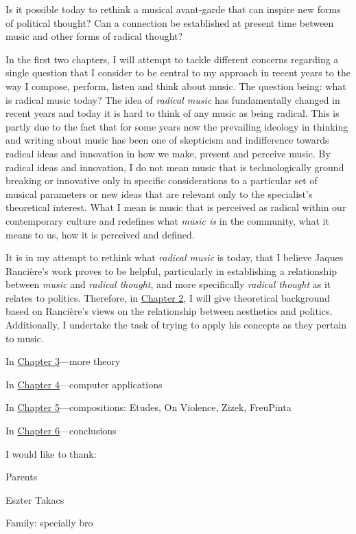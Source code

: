 Is it possible today to rethink a musical \mbox{avant-garde} that can inspire new forms of political thought? Can a connection be established at present time between music and other forms of radical thought?

In the first two chapters, I will attempt to tackle different concerns regarding a single question that I consider to be central to my approach in recent years to the way I compose, perform, listen and think about music. The question being: what is radical music today? The idea of \emph{radical music} has fundamentally changed in recent years and today it is hard to think of any music as being radical. This is partly due to the fact that for some years now the prevailing ideology in thinking and writing about music has been one of skepticism and indifference towards radical ideas and innovation in how we make, present and perceive music. By radical ideas and innovation, I do not mean music that is technologically ground breaking or innovative only in specific considerations to a particular set of musical parameters or new ideas that are relevant only to the specialist's theoretical interest. What I mean is music that is perceived as radical within our contemporary culture and redefines what \emph{music is} in the community, what it means to us, how it is perceived and defined.

It is in my attempt to rethink what \emph{radical music} is today, that I believe Jaques Ranci\`{e}re's work proves to be helpful, particularly in establishing a relationship between \emph{music} and \emph{radical thought}, and more specifically \emph{radical thought} as it relates to politics. Therefore, in \hyperlink{chapter2}{Chapter 2}, I will give theoretical background based on Ranci\`{e}re's views on the relationship between aesthetics and politics. Additionally, I undertake the task of trying to apply his concepts as they pertain to music. 

In \hyperlink{chapter3}{Chapter 3}---more theory

In \hyperlink{chapter4}{Chapter 4}---computer applications

In \hyperlink{chapter5}{Chapter 5}---compositions: Etudes, On Violence, Zizek, FreuPinta

In \hyperlink{chapter6}{Chapter 6}---conclusions


I would like to thank:

Parents 

Eszter Takacs

Family: specially bro

